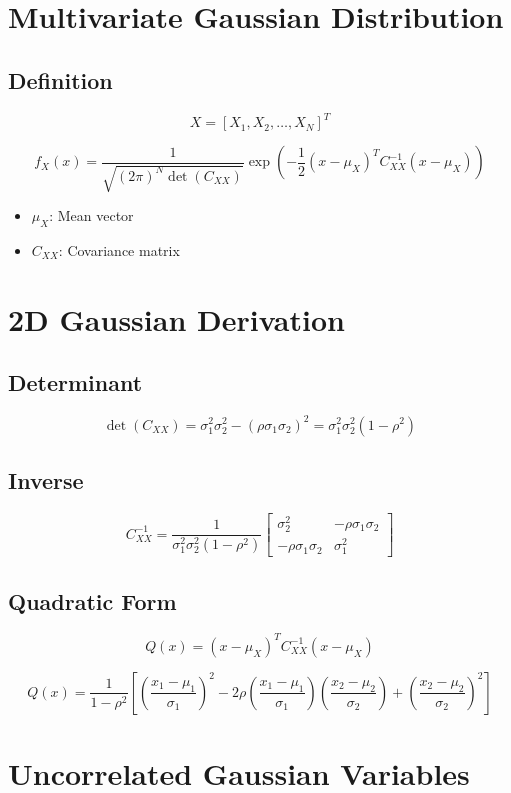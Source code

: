 \documentclass[11pt]{article}
\begin{document}
\section{Multivariate Gaussian Distribution}

\subsection{Definition}
\[
X = [X_1, X_2, \dots, X_N]^T
\]

\[
f_X(x) =
\frac{1}{\sqrt{(2\pi)^N \det(C_{XX})}}
\exp\left(
-\frac{1}{2}(x-\mu_X)^T C_{XX}^{-1} (x-\mu_X)
\right)
\]

\begin{itemize}
\item $\mu_X$: Mean vector
\item $C_{XX}$: Covariance matrix
\end{itemize}

\section{2D Gaussian Derivation}

\subsection{Determinant}
\[
\det(C_{XX}) = \sigma_1^2 \sigma_2^2 - (\rho \sigma_1 \sigma_2)^2
= \sigma_1^2 \sigma_2^2 (1-\rho^2)
\]

\subsection{Inverse}
\[
C_{XX}^{-1} =
\frac{1}{\sigma_1^2 \sigma_2^2 (1-\rho^2)}
\begin{bmatrix}
\sigma_2^2 & -\rho\sigma_1\sigma_2 \\
-\rho\sigma_1\sigma_2 & \sigma_1^2
\end{bmatrix}
\]

\subsection{Quadratic Form}
\[
Q(x) = (x-\mu_X)^T C_{XX}^{-1} (x-\mu_X)
\]

\[
Q(x) =
\frac{1}{1-\rho^2}
\left[
\left(\frac{x_1-\mu_1}{\sigma_1}\right)^2
-2\rho \left(\frac{x_1-\mu_1}{\sigma_1}\right)\left(\frac{x_2-\mu_2}{\sigma_2}\right)
+\left(\frac{x_2-\mu_2}{\sigma_2}\right)^2
\right]
\]

\section{Uncorrelated Gaussian Variables}
\end{document}
